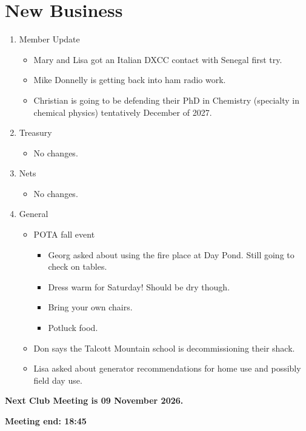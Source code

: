 \documentclass[12pt, letterpaper]{article}
\begin{document}
\section{New Business}
    \begin{enumerate}
    \item Member Update
        \begin{itemize}
            \item Mary and Lisa got an Italian DXCC contact with Senegal first try.
            \item Mike Donnelly is getting back into ham radio work.
            \item Christian is going to be defending their PhD in  Chemistry (specialty in chemical physics) tentatively December of 2027.
        \end{itemize}
    \item Treasury
        \begin{itemize}
            \item No changes.
        \end{itemize}
    \item Nets
        \begin{itemize}
            \item No changes.
        \end{itemize}
    \item General
        \begin{itemize}
            \item POTA fall event
                \begin{itemize}
                    \item Georg asked about using the fire place at Day Pond. Still going to check on tables.
                    \item Dress warm for Saturday! Should be dry though.
                    \item Bring your own chairs.
                    \item Potluck food.
                \end{itemize}
            \item  Don says the Talcott Mountain school is decommissioning their shack.
            \item Lisa asked about generator recommendations for home use and possibly field day use.
        \end{itemize}
    \end{enumerate}

    \textbf{\Large{Next Club Meeting is 09 November 2026.}}

    \textbf{Meeting end: 18:45}
\end{document}
